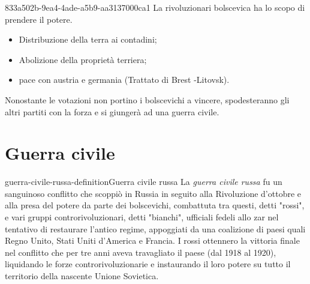 \documentclass[preview]{standalone}
\begin{document}
\begin{snippet}{833a502b-9ea4-4ade-a5b9-aa3137000ca1}
    La rivoluzionari bolscevica ha lo scopo di prendere il potere.
    \begin{itemize}
        \item Distribuzione della terra ai contadini;
        \item Abolizione della proprietà terriera;
        \item pace con austria e germania (Trattato di Brest -Litovsk).
    \end{itemize}
    
    Nonostante le votazioni non portino i bolscevichi a vincere,
    spodesteranno gli altri partiti con la forza e si giungerà ad una guerra civile.
\end{snippet}

\section{Guerra civile}

\begin{snippetdefinition}{guerra-civile-russa-definition}{Guerra civile russa}
    La \textit{guerra civile russa} fu un sanguinoso conflitto che scoppiò in Russia in
    seguito alla Rivoluzione d'ottobre e alla presa del potere da parte dei bolscevichi,
    combattuta tra questi, detti "rossi", e vari gruppi controrivoluzionari,
    detti "bianchi", ufficiali fedeli allo zar nel tentativo di restaurare l'antico regime,
    appoggiati da una coalizione di paesi quali Regno Unito, Stati Uniti d'America e Francia.
    I rossi ottennero la vittoria finale nel conflitto che per tre anni aveva
    travagliato il paese (dal 1918 al 1920), liquidando le forze
    controrivoluzionarie e instaurando il loro potere su tutto il
    territorio della nascente Unione Sovietica.
\end{snippetdefinition}
\end{document}
